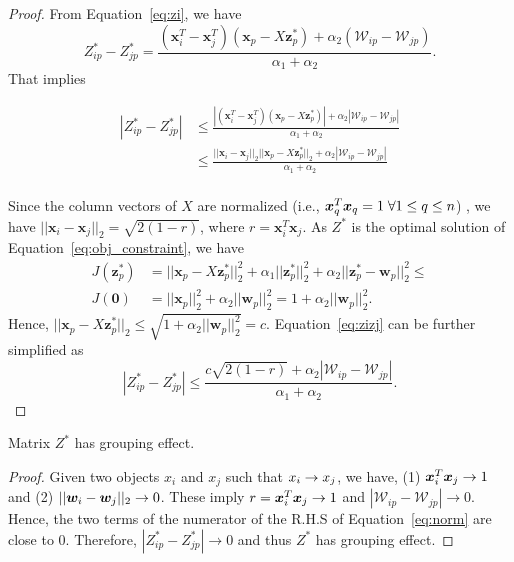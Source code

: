 \begin{proof}
From Equation~\ref{eq:zi}, we have 
\begin{equation}
\nonumber
Z_{ip}^*-Z_{jp}^* = \frac{(\bm{x}_i^T - \bm{x}_j^T)(\bm{x}_p-X\bm{z}_p^*) + \alpha_2 (\mathcal{W}_{ip}-\mathcal{W}_{jp})}{\alpha_1+\alpha_2}.
\end{equation}
That implies 
\begin{small}
\begin{equation}
\label{eq:zizj}
\begin{split}
|Z_{ip}^*-Z_{jp}^*| & \leq \frac{|(\bm{x}_i^T - \bm{x}_j^T)(\bm{x}_p-X\bm{z}_p^*)| + \alpha_2 |\mathcal{W}_{ip}-\mathcal{W}_{jp}|}{\alpha_1+\alpha_2}\\
& \leq \frac{||\bm{x}_i - \bm{x}_j||_2||\bm{x}_p-X\bm{z}_p^*||_2 + \alpha_2 |\mathcal{W}_{ip}-\mathcal{W}_{jp}|}{\alpha_1+\alpha_2}\\
\end{split}
\end{equation}
\end{small}

Since the column vectors of $X$ are normalized (i.e., $\bm{x}_q^T \bm{x}_q = 1 \; \forall 1 \leq q \leq n$) , we have
$||\bm{x}_i - \bm{x}_j||_2 = \sqrt{2(1-r)}$,
where $r = \bm{x}_i^T\bm{x}_j$.
As $Z^*$ is the optimal solution of Equation~\ref{eq:obj_constraint}, we have
\begin{equation}
\begin{split}
J(\bm{z}_p^*) & = ||\bm{x}_p-X\bm{z}_p^*||_2^2 + \alpha_1 ||\bm{z}_p^*||_2^2 + \alpha_2 ||\bm{z}_p^*-\bm{w}_p||_2^2 \leq  \\
J(\bm{0}) & = ||\bm{x}_p||_2^2 + \alpha_2 ||\bm{w}_p||_2^2 = 1 + \alpha_2 ||\bm{w}_p||_2^2.
\end{split}
\end{equation}
Hence, $||\bm{x}_p-X\bm{z}_p^*||_2 \leq \sqrt{1 + \alpha_2 ||\bm{w}_p||_2^2} = c$.
Equation~\ref{eq:zizj} can be further simplified as
\begin{equation}
\nonumber
|Z_{ip}^*-Z_{jp}^*| \leq \frac{c\sqrt{2(1-r)}+ \alpha_2 |\mathcal{W}_{ip}-\mathcal{W}_{jp}|}{\alpha_1+\alpha_2}.
\end{equation}
\end{proof}

\begin{lemma}
Matrix $Z^*$ has grouping effect.
\label{lemma:z-star}
\end{lemma}
\begin{proof}
Given two objects $x_i$ and $x_j$ such that $x_{i} \rightarrow x_{j}$,
we have,  %
(1) $\bm{x}_i^T \bm{x}_j \rightarrow 1$ and (2) $||{\bm w}_{i}-{\bm w}_{j}||_2 \rightarrow 0$.
These imply
$r = \bm{x}_i^T \bm{x}_j \rightarrow 1$ and  $|\mathcal{W}_{ip}-\mathcal{W}_{jp}| \rightarrow 0$.
Hence, the two terms of the numerator of the R.H.S of Equation~\ref{eq:norm} are close to 0. 
Therefore, $|Z_{ip}^*-Z_{jp}^*| \rightarrow 0$ and thus $Z^*$ has grouping effect.
\end{proof}

